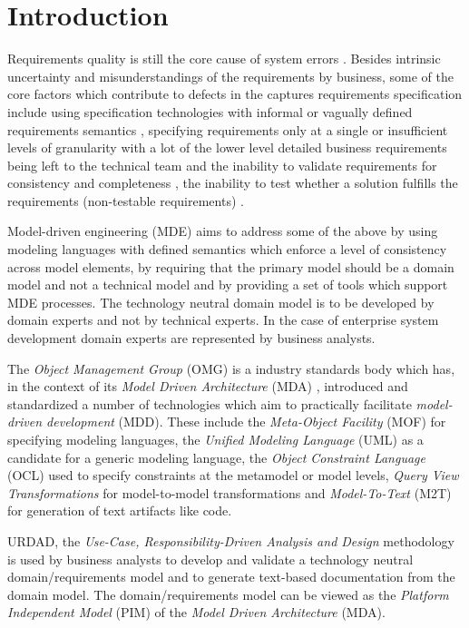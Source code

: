 \section{Introduction}

Requirements quality is still the core cause of system errors \cite{heck_experiences_2008}. Besides intrinsic uncertainty and misunderstandings of the requirements by business, some of the core factors which contribute to defects in the captures requirements specification include using specification technologies with informal or vagually defined requirements semantics \cite{ferguson_empirical_2006}, specifying requirements only at a single or insufficient levels of granularity with a lot of the lower level detailed business requirements being left to the technical team and the inability to validate requirements for consistency and completeness \cite{}, the inability to test whether a solution fulfills the requirements (non-testable requirements) \cite{bashardoust-tajali_extracting_2008}.

Model-driven engineering (MDE) aims to address some of the above by using modeling languages with defined semantics which enforce a level of consistency across model elements, by requiring that the primary model should be a domain model and not a technical model and by providing a set of tools which support MDE processes. The technology neutral domain model is to be developed by domain experts and not by technical experts. In the case of enterprise system development domain experts are represented by business analysts.

The {\em Object Management Group} (OMG) is a industry standards body which has, in the context of its {\em Model Driven Architecture} (MDA) \cite{siegel_developing_2001}, introduced and standardized a number of technologies which aim to practically facilitate {\em model-driven development} (MDD). These include the {\em Meta-Object Facility} (MOF) for specifying modeling languages, the {\em Unified Modeling Language} (UML) as a candidate for a generic modeling language, the {\em Object Constraint Language} (OCL) used to specify constraints at the metamodel or model levels, {\em Query View Transformations} for model-to-model transformations and {\em Model-To-Text} (M2T) for generation of text artifacts like code. 

URDAD, the {\em Use-Case, Responsibility-Driven Analysis and Design} \cite{solms_technology_2007} methodology is used by business analysts to develop and validate a technology neutral domain/requirements model and to generate text-based documentation from the domain model. The domain/requirements model can be viewed as the {\em Platform Independent Model} (PIM) \cite{solms_urdad_2010} of the {\em Model Driven Architecture} (MDA).

